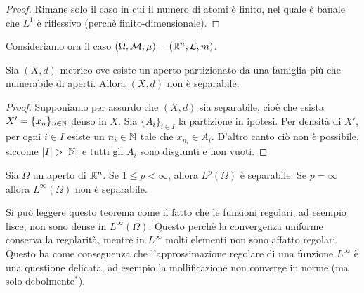 \begin{proof}
	Rimane solo il caso in cui il numero di atomi è finito, nel quale è banale che $L^1$ è riflessivo (perchè finito-dimensionale).
\end{proof}

Consideriamo ora il caso $(\Omega, \mathcal{M}, \mu) = (\mathbb{R}^n, \mathcal{L}, m)$.

\begin{lemma}
\label{lemma:neg_sep_lemma}
	Sia $(X,d)$ metrico ove esiste un aperto partizionato da una famiglia più che numerabile di aperti.
	Allora $(X,d)$ non è separabile.
\end{lemma}
\begin{proof}
	Supponiamo per assurdo che $(X,d)$ sia separabile, cioè che esista $X'=\{x_n\}_{n \in \mathbb{N}}$ denso in $X$. Sia $\{A_i\}_{i \in I}$ la partizione in ipotesi.
	Per densità di $X'$, per ogni $i \in I$ esiste un $n_i \in \mathbb{N}$ tale che $x_{n_i} \in A_i$.
	D'altro canto ciò non è possibile, siccome $\left|{I}\right| > \left|{\mathbb{N}}\right|$ e tutti gli $A_i$ sono disgiunti e non vuoti.
\end{proof}

\begin{theorem}
	Sia $\Omega$ un aperto di $\mathbb{R}^n$. Se $1 \leq p < \infty$, allora $L^p(\Omega)$ è separabile. Se $p=\infty$ allora $L^\infty(\Omega)$ non è separabile.
\end{theorem}

\begin{remark}
	Si può leggere questo teorema come il fatto che le funzioni regolari, ad esempio lisce, non sono dense in $L^\infty(\Omega)$. Questo perchè la convergenza uniforme conserva la regolarità, mentre in $L^\infty$ molti elementi non sono affatto regolari.
	Questo ha come conseguenza che l'approssimazione regolare di una funzione $L^\infty$ è una questione delicata, ad esempio la mollificazione non converge in norme (ma solo debolmente$^*$).
\end{remark}


